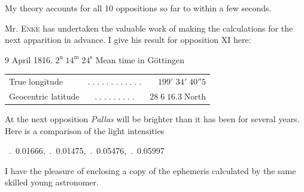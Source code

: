 \par\indent My theory accounts for all 10 oppositions so far to within a few seconds.

\par\indent Mr. \textsc{Enke} has undertaken the valuable work of making the calculations for the next apparition in advance. I give his result for opposition XI here:

\begin{center}9 April 1816. $2^{\mathrm u}\;14^{\mathrm m}\;24^{\mathrm s}$ Mean time in Göttingen\end{center}
\begin{center}\fontsize{10}{12}\selectfont\setlength{\tabcolsep}{3pt}\renewcommand{\arraystretch}{1.15}\begin{tabular}{lcr}
True longitude & $.\;.\;.\;.\;.\;.\;.\;.\;.\;.\;.\;.$ & $199^\circ\;34'\;40''5$\\
Geocentric latitude & $.\;.\;.\;.\;.\;.\;.\;.\;.$ & $28\;6\;16.3\;\text{North}$\\
\end{tabular}\end{center}

\par\indent At the next opposition \emph{Pallas} will be brighter than it has been for several years. Here is a comparison of the light intensities

\begin{center}\fontsize{9}{11}\ .\ 0.01666,\ .\ 0.01475,\ .\ 0.05476,\ .\ 0.05997
\end{center}

\par\indent I have the pleasure of enclosing a copy of the ephemeris calculated by the same skilled young astronomer.

